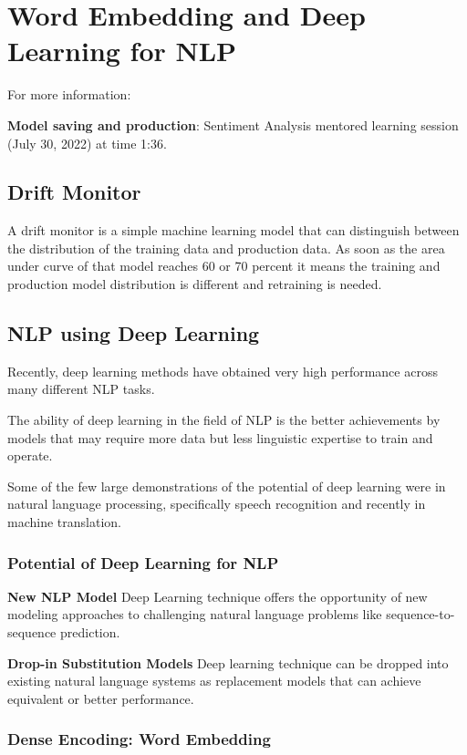 	\chapter{Word Embedding and Deep Learning for NLP}

For more information:
	\begin{bulletedlist}
		\item \textbf{Model saving and production}: Sentiment Analysis mentored learning session (July 30, 2022) at time 1:36.
	\end{bulletedlist}

	\section{Drift Monitor}
A drift monitor is a simple machine learning model that can distinguish between the distribution of the training data and production data.  As soon as the area under curve of that model reaches 60 or 70 percent it means the training and production model distribution is different and retraining is needed.

	\section{NLP using Deep Learning}

	\begin{bulletedlist}
		\item Recently, deep learning methods have obtained very high performance across many different NLP tasks.
		\item The ability of deep learning in the field of NLP is the better achievements by models that may require more data but less linguistic expertise to train and operate.
		\item Some of the few large demonstrations of the potential of deep learning were in natural language processing, specifically speech recognition and recently in machine translation.
	\end{bulletedlist}

	\subsection{Potential of Deep Learning for NLP}

	\begin{bulletedlist}
		\item \textbf{New NLP Model} Deep Learning technique offers the opportunity of new modeling approaches to challenging natural language problems like sequence-to-sequence prediction.
		\item \textbf{Drop-in Substitution Models} Deep learning technique can be dropped into existing natural language systems as replacement models that can achieve equivalent or better performance.
	\end{bulletedlist}

	\subsection{Dense Encoding: Word Embedding} 